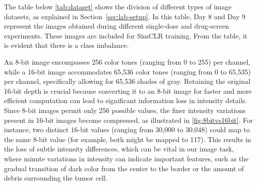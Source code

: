 The table below \ref{tab:dataset} shows the division of different types of image datasets, as explained in Section~\ref{sec:lab-setup}. In this table, Day 8 and Day 9 represent the images obtained during different single-dose and drug-screen experiments. These images are included for SimCLR training. From the table, it is evident that there is a class imbalance.
\begin{table}[H]
  \centering
  \caption{Dataset Class Overview}
  \label{tab:dataset}
\end{table}
An 8-bit image encompasses 256 color tones (ranging from 0 to 255) per channel, while a 16-bit image accommodates 65,536 color tones (ranging from 0 to 65,535) per channel, specifically allowing for 65,536 shades of gray. Retaining the original 16-bit depth is crucial because converting it to an 8-bit image for faster and more efficient computation can lead to significant information loss in intensity details. Since 8-bit images permit only 256 possible values, the finer intensity variations present in 16-bit images become compressed, as illustrated in \ref{fig:8bitvs16bit}. For instance, two distinct 16-bit values (ranging from 30,000 to 30,048) could map to the same 8-bit value (for example, both might be mapped to 117). This results in the loss of subtle intensity differences, which can be vital in our image task, where minute variations in intensity can indicate important features, such as the gradual transition of dark color from the center to the border or the amount of debris surrounding the tumor cell.


